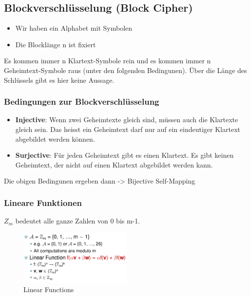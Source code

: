\hypertarget{blockverschluxfcsselung}{%
\subsection{Blockverschlüsselung (Block Cipher)}\label{blockverschluxfcsselung}}

\begin{itemize}
\tightlist
\item
  Wir haben ein Alphabet mit Symbolen
\item
  Die Blocklänge n ist fixiert
\end{itemize}

Es kommen immer n Klartext-Symbole rein und es kommen immer n Geheimtext-Symbole raus (unter den folgenden Bedingunen). Über die Länge des Schlüssels gibt es hier keine Aussage.

\hypertarget{bedingungen-blockverschlüsselung}{%
\subsubsection{Bedingungen zur Blockverschlüsselung}\label{bedingungen-blockverschlüsselung}}

\begin{itemize}
\tightlist
\item
  \textbf{Injective}: Wenn zwei Geheimtexte gleich sind, müssen auch die
  Klartexte gleich sein. Das heisst ein Geheimtext darf nur auf ein
  eindeutiger Klartext abgebildet werden können.
\item
  \textbf{Surjective}: Für jeden Geheimtext gibt es einen Klartext. Es
  gibt keinen Geheimtext, der nicht auf einen Klartext abgebildet werden
  kann.
\end{itemize}

\begin{tcolorbox}[colback=red!5!white,colframe=red!75!black]
Die obigen Bedingunen ergeben dann -> Bijective Self-Mapping
\end{tcolorbox}

\hypertarget{lineare-funktionen}{%
\subsubsection{Lineare Funktionen}\label{lineare-funktionen}}

$Z_m$ bedeutet alle ganze Zahlen von 0 bis m-1.

\begin{figure}[H]
\centering
\includegraphics[width=0.5\textwidth]{figures/linearFunctions.png}
\caption{Linear Functions}
\end{figure}

